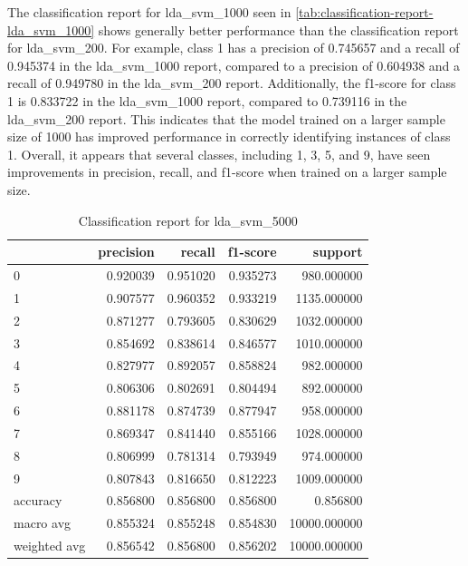 The classification report for lda_svm_1000 seen in \ref*{tab:classification-report-lda_svm_1000} shows generally better performance than the classification report for lda_svm_200. For example, class 1 has a precision of 0.745657 and a recall of 0.945374 in the lda_svm_1000 report, compared to a precision of 0.604938 and a recall of 0.949780 in the lda_svm_200 report. Additionally, the f1-score for class 1 is 0.833722 in the lda_svm_1000 report, compared to 0.739116 in the lda_svm_200 report. This indicates that the model trained on a larger sample size of 1000 has improved performance in correctly identifying instances of class 1. Overall, it appears that several classes, including 1, 3, 5, and 9, have seen improvements in precision, recall, and f1-score when trained on a larger sample size.


\begin{table}[htb!]
    \centering
    \caption{Classification report for lda_svm_5000}
    \label{tab:classification-report-lda_svm_5000}
    \begin{tabular}{lrrrr}
    \toprule
     & precision & recall & f1-score & support \\
    \midrule
    0 & 0.920039 & 0.951020 & 0.935273 & 980.000000 \\
    1 & 0.907577 & 0.960352 & 0.933219 & 1135.000000 \\
    2 & 0.871277 & 0.793605 & 0.830629 & 1032.000000 \\
    3 & 0.854692 & 0.838614 & 0.846577 & 1010.000000 \\
    4 & 0.827977 & 0.892057 & 0.858824 & 982.000000 \\
    5 & 0.806306 & 0.802691 & 0.804494 & 892.000000 \\
    6 & 0.881178 & 0.874739 & 0.877947 & 958.000000 \\
    7 & 0.869347 & 0.841440 & 0.855166 & 1028.000000 \\
    8 & 0.806999 & 0.781314 & 0.793949 & 974.000000 \\
    9 & 0.807843 & 0.816650 & 0.812223 & 1009.000000 \\
    accuracy & 0.856800 & 0.856800 & 0.856800 & 0.856800 \\
    macro avg & 0.855324 & 0.855248 & 0.854830 & 10000.000000 \\
    weighted avg & 0.856542 & 0.856800 & 0.856202 & 10000.000000 \\
    \bottomrule
    \end{tabular}
    \end{table}


